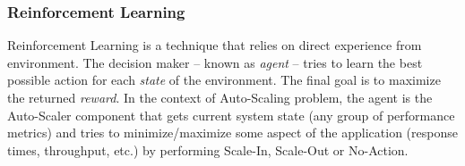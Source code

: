 \subsubsection{Reinforcement Learning}
\label{ias:alg-rl}

Reinforcement Learning is a technique that relies on direct experience from environment. The decision maker -- known as \emph{agent} -- tries to learn the best possible action for each \emph{state} of the environment. The final goal is to maximize the returned \emph{reward}. In the context of Auto-Scaling problem, the agent is the Auto-Scaler component that gets current system state (any group of performance metrics) and tries to minimize/maximize some aspect of the application (response times, throughput, etc.) by performing Scale-In, Scale-Out or No-Action.

